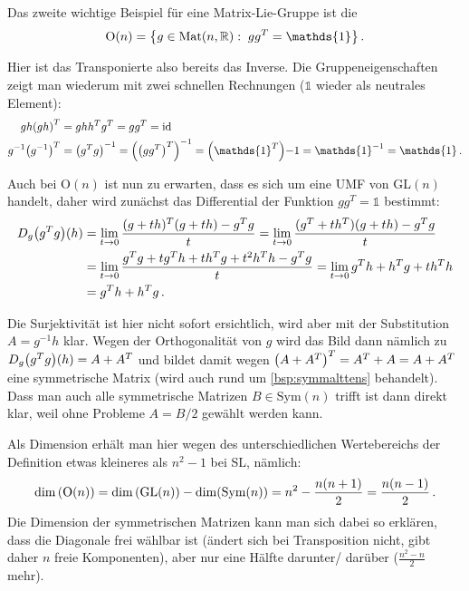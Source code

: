 \documentclass[../H_Analysis_main.tex]{subfiles}
\begin{document}
\begin{bsp}
Das zweite wichtige Beispiel für eine Matrix-Lie-Gruppe ist die 
\begin{equation}
\text{O}(n) = \qty{g \in \text{Mat}(n, \mathbb{R}): \; g g^T = \mathds{1}} \, .
\end{equation}

Hier ist das Transponierte also bereits das Inverse. Die Gruppeneigenschaften zeigt man wiederum mit zwei schnellen Rechnungen ($\mathds{1}$ wieder als neutrales Element):
\begin{align*}
gh \qty(gh)^T &= gh h^T g^T = g g^T = \text{id}
\\
g^{-1} \qty(g^{-1})^T &= \qty(g^T g)^{-1} = \qty(\qty(g g^T)^T)^{-1} = \qty(\mathds{1}^T){-1} = \mathds{1}^{-1} = \mathds{1} \, .
\end{align*}

Auch bei O$(n)$ ist nun zu erwarten, dass es sich um eine UMF von GL$(n)$ handelt, daher wird zunächst das Differential der Funktion $g g^T = \mathds{1}$ bestimmt:
\begin{align}
D_g \qty(g^T g)(h) &= \lim_{t \rightarrow 0} \frac{(g + t h)^T (g + t h) - g^T g}{t} = \lim_{t \rightarrow 0} \frac{(g^T + t h^T) (g + t h) - g^T g}{t}
\notag\\
&= \lim_{t \rightarrow 0} \frac{g^T g + t g^T h + t h^T g + t^2 h^T h - g^T g}{t} = \lim_{t \rightarrow 0} g^T h + h^T g + t h^T h
\notag\\
&= g^T h + h^T g \, . \label{eq:ablggtrans}
\end{align}

Die Surjektivität ist hier nicht sofort ersichtlich, wird aber mit der Substitution $A = g^{-1} h$ klar. Wegen der Orthogonalität von $g$ wird das Bild dann nämlich zu $D_g \qty(g^T g)(h) = A + A^T$ und bildet damit wegen $\qty(A + A^T)^T = A^T + A = A + A^T$ eine symmetrische Matrix (wird auch rund um \ref{bsp:symmalttens} behandelt). Dass man auch alle symmetrische Matrizen $B \in \text{Sym}(n)$ trifft ist dann direkt klar, weil ohne Probleme $A = B/ 2$ gewählt werden kann.

Als Dimension erhält man hier wegen des unterschiedlichen Wertebereichs der Definition etwas kleineres als $n^2 - 1$ bei SL, nämlich:
\begin{equation}
\dim\qty(\text{O}(n)) = \dim\qty(\text{GL}(n)) - \dim(\text{Sym}(n)) = n^2 - \frac{n (n + 1)}{2} = \frac{n (n - 1)}{2} \, .
\end{equation}
Die Dimension der symmetrischen Matrizen kann man sich dabei so erklären, dass die Diagonale frei wählbar ist (ändert sich bei Transposition nicht, gibt daher $n$ freie Komponenten), aber nur eine Hälfte darunter/ darüber ($\frac{n^2 - n}{2}$ mehr).\\



\end{bsp}
\end{document}
